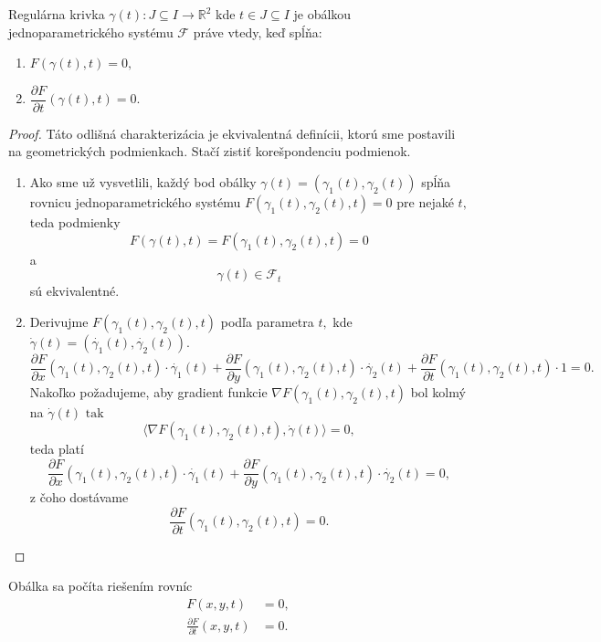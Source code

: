 \begin{theorem}
Regulárna krivka $\gamma(t) \colon J \subseteq I \rightarrow \mathbb{R}^{2}$ kde $t \in J  \subseteq I$ je obálkou jednoparametrického systému $\mathcal{F}$ práve vtedy, keď spĺňa:
\begin{enumerate}
\item $F(\gamma(t), t) = 0, $ 
\item $\dfrac{\partial F}{\partial t}(\gamma(t), t) = 0.$
\end{enumerate}
\end{theorem}

\begin{proof}
Táto odlišná charakterizácia je ekvivalentná definícii, ktorú sme postavili na geometrických podmienkach. Stačí zistiť korešpondenciu podmienok.
\begin{enumerate}
\item Ako sme už vysvetlili, každý bod obálky ${\gamma}(t) = (\gamma_{1}(t),\gamma_{2}(t))$ spĺňa rovnicu jednoparametrického systému $F(\gamma_{1}(t),\gamma_{2}(t),t)=0$ pre nejaké $t,$ teda podmienky 
$$ F(\gamma(t), t) = F(\gamma_{1}(t), \gamma_{2}(t), t) = 0$$
a
$$\gamma(t) \in \mathcal{F}_{t}$$
sú ekvivalentné.
\item Derivujme $F(\gamma_{1}(t),\gamma_{2}(t), t)$ podľa parametra $t,$ kde $ \dot{\gamma}(t) = ( \dot{\gamma_{1}}(t), \dot{\gamma_{2}}(t) ).$
$$ \frac{\partial F}{\partial x}(\gamma_{1}(t),\gamma_{2}(t),t) \cdot \dot{\gamma_{1}}(t)+\frac{\partial F}{\partial y}(\gamma_{1}(t),\gamma_{2}(t),t) \cdot \dot{\gamma_{2}}(t)+\frac{\partial F}{\partial t}(\gamma_{1}(t),\gamma_{2}(t),t) \cdot 1 = 0. $$
Nakoľko požadujeme, aby gradient funkcie $\nabla F(\gamma_{1}(t),\gamma_{2}(t),t)$ bol kolmý na $\dot{\gamma}(t) \text{ tak}$
$$ \langle \nabla F(\gamma_{1}(t),\gamma_{2}(t),t), \dot{\gamma}(t) \rangle = 0,$$
teda platí
$$ \frac{\partial F}{\partial x}(\gamma_{1}(t),\gamma_{2}(t),t) \cdot \dot{\gamma_{1}}(t)+\frac{\partial F}{\partial y}(\gamma_{1}(t),\gamma_{2}(t),t) \cdot \dot{\gamma_{2}}(t) = 0, $$
z čoho dostávame
$$ \frac{\partial F}{\partial t}(\gamma_{1}(t),\gamma_{2}(t),t) = 0. $$ 
\end{enumerate}
\end{proof}

Obálka sa počíta riešením rovníc
\begin{align*}
F(x, y, t) &= 0, \\
\frac{\partial F}{\partial t}(x,y,t) &= 0. \\
\end{align*}

